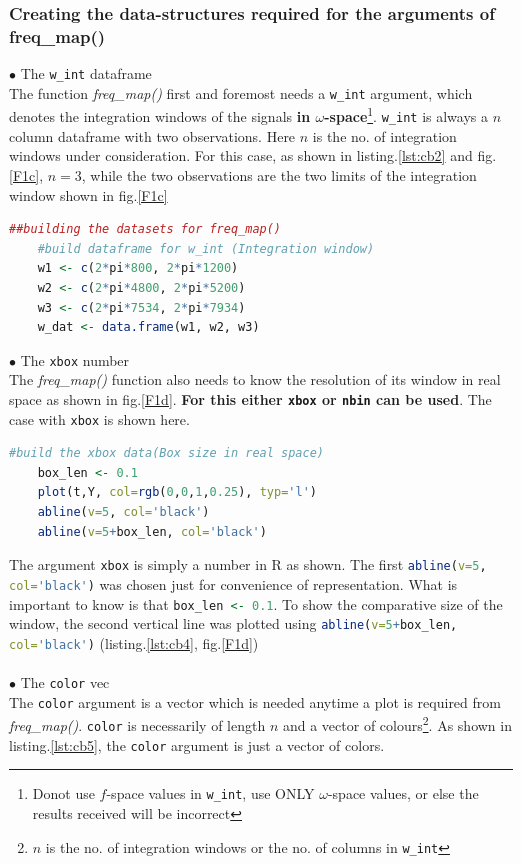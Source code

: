 \documentclass{article}
\begin{document}
 \subsubsection{Creating the data-structures required for the arguments of freq\_map()}
 $\bullet$ The \lstinline[language=R]|w_int| dataframe\\
 The function \textit{freq\_map()} first and foremost needs a \lstinline[language=R]|w_int| argument, which denotes the integration windows of the signals \textbf{in $\omega$-space}\footnote{Donot use $f$-space values in \lstinline[language=R]|w_int|, use ONLY $\omega$-space values, or else the results received will be incorrect}. \lstinline[language=R]|w_int| is always a $n$ column dataframe with two observations. Here $n$ is the no. of integration windows under consideration. For this case, as shown in listing.\ref{lst:cb2} and fig.\ref{F1c}, $n=3$, while the two observations are the two limits of the integration window shown in fig.\ref{F1c}
  \begin{lstlisting}[language=R, label={lst:cb3}, caption={code for the w\_int dataframe for the three frequency windows in fig.\ref{F1c}}, captionpos=b]
	##building the datasets for freq_map()
	#build dataframe for w_int (Integration window)
	w1 <- c(2*pi*800, 2*pi*1200)
	w2 <- c(2*pi*4800, 2*pi*5200)
	w3 <- c(2*pi*7534, 2*pi*7934)
	w_dat <- data.frame(w1, w2, w3)
 \end{lstlisting}
$\bullet$ The \lstinline[language=R]|xbox| number\\
The \textit{freq\_map()} function also needs to know the resolution of its window in real space as shown in fig.\ref{F1d}. \textbf{For this either \lstinline[language=R]|xbox| or \lstinline[language=R]|nbin| can be used}. The case with \lstinline[language=R]|xbox| is shown here.
\pagebreak
  \begin{lstlisting}[language=R, label={lst:cb4}, caption={code for the xbox number fig.\ref{F1d}}, captionpos=b]
	#build the xbox data(Box size in real space)
	box_len <- 0.1
	plot(t,Y, col=rgb(0,0,1,0.25), typ='l')
	abline(v=5, col='black')
	abline(v=5+box_len, col='black')
\end{lstlisting}
The argument \lstinline[language=R]|xbox| is simply a number in R as shown. The first \lstinline[language=R]|abline(v=5, col='black')| was chosen just for convenience of representation. What is important to know is that \lstinline[language=R]|box_len <- 0.1|. To show the comparative size of the window, the second vertical line was plotted using \lstinline[language=R]|abline(v=5+box_len, col='black')| (listing.\ref{lst:cb4}, fig.\ref{F1d})\\
\\
$\bullet$ The \lstinline[language=R]|color| vec\\
The \lstinline[language=R]|color| argument is a vector which is needed anytime a plot is required from \textit{freq\_map()}.
\lstinline[language=R]|color| is necessarily of length $n$ and a vector of colours\footnote{$n$ is the no. of integration windows or the no. of columns in \lstinline[language=R]|w_int|}. As shown in listing.\ref{lst:cb5}, the \lstinline[language=R]|color| argument is just a vector of colors.
\end{document}
